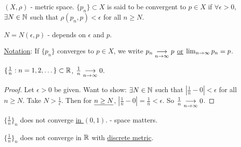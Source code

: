 \documentclass[]{article}
\begin{document}
\begin{definition}
	 $(X,\rho)$ - metric space.
	$\{p_n\}\subset X$ is said to be convergent to $p\in X$ if $\forall \epsilon >0$, $\exists N\in\mathbb{N}$ such that $\rho(p_n,p)<\epsilon$ for all $n\geq N$.
\end{definition}
\begin{note}
	$N = N(\epsilon,p)$ - depends on $\epsilon$ and $p$.
\end{note}
\ul{Notation}: If $\{p_n\}$ converges to $p\in X$, we write $p_n\underset{n\rightarrow\infty}{\longrightarrow}p$ \ul{\ul{or}} $\lim_{n\rightarrow\infty} p_n = p$.
\begin{example}
	$\{\frac{1}{n}:n=1,2,\dots\}\subset\mathbb{R}$, $\frac{1}{n}\underset{n\rightarrow\infty}{\longrightarrow}0$.
\end{example}
\begin{proof}
	Let $\epsilon>0$ be given. Want to show: $\exists N\in\mathbb{N}$ such that $|\frac{1}{n} - 0|<\epsilon$ for all $n\geq N$.
	Take $N>\frac{1}{\epsilon}$. Then for $\underline{n\geq N}$, $|\frac{1}{n}-0| = \frac{1}{n} < \epsilon$. So $\frac{1}{n} \underset{n\rightarrow\infty}{\longrightarrow}0$.
\end{proof}
\begin{example}
	$\{\frac{1}{n}\}_n$ does not converge \ul{in $(0,1)$}. - space matters.
\end{example}
\begin{example}
	$\{\frac{1}{n}\}_n$ does not converge in $\mathbb{R}$ with \ul{discrete metric}.
\end{example}
\end{document}
